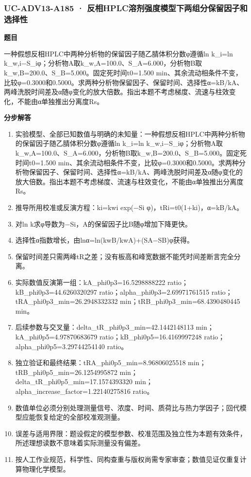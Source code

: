 \documentclass[UTF8,11pt,a4paper]{ctexart}
\begin{document}
\subsubsection*{UC-ADV13-A185 · 反相HPLC溶剂强度模型下两组分保留因子和选择性}
\noindent\textbf{题目}\par
一种假想反相HPLC中两种分析物的保留因子随乙腈体积分数φ遵循ln k\_i=ln k\_w,i−S\_iφ；分析物A取k\_w,A=100.0、S\_A=6.000，分析物B取k\_w,B=200.0、S\_B=5.000。固定死时间t0=1.500 min、其余流动相条件不变，比较φ=0.3000和0.5000。求两种分析物保留因子、保留时间、选择性α=kB/kA、两峰洗脱时间差及α随φ变化的放大倍数。指出本题不考虑梯度、流速与柱效变化，不能由α单独推出分离度Rs。\par
\medskip\noindent\textbf{分步解答}
\begin{enumerate}
\item 实验模型、全部已知数值与明确的未知量：一种假想反相HPLC中两种分析物的保留因子随乙腈体积分数φ遵循ln k\_i=ln k\_w,i−S\_iφ；分析物A取k\_w,A=100.0、S\_A=6.000，分析物B取k\_w,B=200.0、S\_B=5.000。固定死时间t0=1.500 min、其余流动相条件不变，比较φ=0.3000和0.5000。求两种分析物保留因子、保留时间、选择性α=kB/kA、两峰洗脱时间差及α随φ变化的放大倍数。指出本题不考虑梯度、流速与柱效变化，不能由α单独推出分离度Rs。
\item 推导所用校准或反演方程：ki=kwi exp(−Si φ)，tRi=t0(1+ki)，α=kB/kA。
\item 对ln k求φ导数为−Si，A的保留因子比B随φ增加下降更快。
\item 选择性α指数增长，由lnα=ln(kwB/kwA)+(SA−SB)φ获得。
\item 保留时间差只需两峰tR之差；没有板高和峰宽数据不能凭时间差断言完全分离。
\item 实际数值反演第一组：kA\_phi0p3=16.5298888222 ratio；kB\_phi0p3=44.6260320297 ratio；alpha\_phi0p3=2.69971761515 ratio；tRA\_phi0p3\_min=26.2948332332 min；tRB\_phi0p3\_min=68.4390480445 min。
\item 后续参数与交叉量：delta\_tR\_phi0p3\_min=42.1442148113 min；kA\_phi0p5=4.97870683679 ratio；kB\_phi0p5=16.4169997248 ratio；alpha\_phi0p5=3.29744254140 ratio。
\item 独立验证和最终结果：tRA\_phi0p5\_min=8.96806025518 min；tRB\_phi0p5\_min=26.1254995872 min；delta\_tR\_phi0p5\_min=17.1574393320 min；alpha\_increase\_factor=1.22140275816 ratio。
\item 数值单位必须分别处理测量信号、浓度、时间、质荷比与热力学因子；回代模型应能恢复给定的全部校准观测量。
\item 误差与适用界限：题设假定的模型参数、校准范围及独立性为本题有效条件，所述理想读数不意味着实际测量没有偏差。
\item 按人工作业规范，科学性、同构查重与版权尚需专家审查；数值见证仅重复计算物理化学模型。
\end{enumerate}
\end{document}
